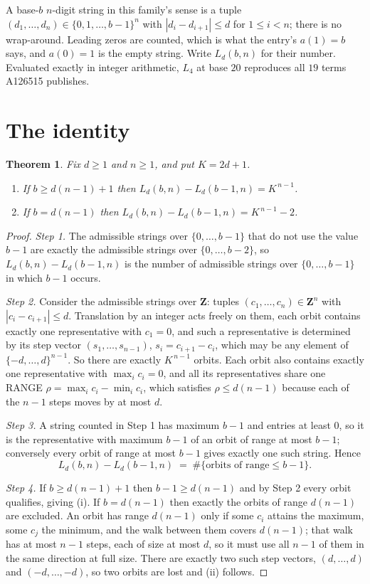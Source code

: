 \documentclass[11pt,a4paper]{article}
\theoremstyle{plain}
\newtheorem{theorem}{Theorem}
\theoremstyle{definition}
\begin{document}
A base-$b$ $n$-digit string in this family's sense is a tuple
$(d_1,\dots,d_n)\in\{0,1,\dots,b-1\}^{n}$ with $|d_i-d_{i+1}|\le d$ for $1\le i<n$; there
is no wrap-around. Leading zeros are counted, which is what the entry's $a(1)=b$ says, and
$a(0)=1$ is the empty string. Write $L_d(b,n)$ for their number. Evaluated exactly in integer
arithmetic, $L_{4}$ at base $20$ reproduces all $19$ terms A126515 publishes.

\section{The identity}

\begin{theorem}
Fix $d\ge1$ and $n\ge1$, and put $K=2d+1$.
\begin{enumerate}
\item[(i)] If $b\ge d(n-1)+1$ then $L_d(b,n)-L_d(b-1,n)=K^{\,n-1}$.
\item[(ii)] If $b=d(n-1)$ then $L_d(b,n)-L_d(b-1,n)=K^{\,n-1}-2$.
\end{enumerate}
\end{theorem}

\begin{proof}
\emph{Step 1.} The admissible strings over $\{0,\dots,b-1\}$ that do not use the value $b-1$
are exactly the admissible strings over $\{0,\dots,b-2\}$, so $L_d(b,n)-L_d(b-1,n)$ is the
number of admissible strings over $\{0,\dots,b-1\}$ in which $b-1$ occurs.

\emph{Step 2.} Consider the admissible strings over $\mathbf{Z}$: tuples
$(c_1,\dots,c_n)\in\mathbf{Z}^{n}$ with $|c_i-c_{i+1}|\le d$. Translation by an integer acts
freely on them, each orbit contains exactly one representative with $c_1=0$, and such a
representative is determined by its step vector $(s_1,\dots,s_{n-1})$, $s_i=c_{i+1}-c_i$,
which may be any element of $\{-d,\dots,d\}^{n-1}$. So there are exactly $K^{\,n-1}$ orbits.
Each orbit also contains exactly one representative with $\max_i c_i=0$, and all its
representatives share one RANGE $\rho=\max_ic_i-\min_ic_i$, which satisfies
$\rho\le d(n-1)$ because each of the $n-1$ steps moves by at most $d$.

\emph{Step 3.} A string counted in Step 1 has maximum $b-1$ and entries at least $0$, so it is
the representative with maximum $b-1$ of an orbit of range at most $b-1$; conversely every orbit
of range at most $b-1$ gives exactly one such string. Hence
\[
L_d(b,n)-L_d(b-1,n)\;=\;\#\{\text{orbits of range}\le b-1\} .
\]

\emph{Step 4.} If $b\ge d(n-1)+1$ then $b-1\ge d(n-1)$ and by Step 2 every orbit qualifies,
giving (i). If $b=d(n-1)$ then exactly the orbits of range $d(n-1)$ are excluded. An orbit has
range $d(n-1)$ only if some $c_i$ attains the maximum, some $c_j$ the minimum, and the walk
between them covers $d(n-1)$; that walk has at most $n-1$ steps, each of size at most $d$, so it
must use all $n-1$ of them in the same direction at full size. There are exactly two such step
vectors, $(d,\dots,d)$ and $(-d,\dots,-d)$, so two orbits are lost and (ii) follows.
\end{proof}
\end{document}
